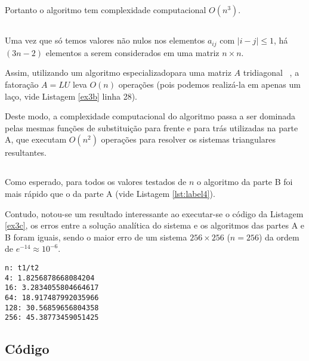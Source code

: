 \documentclass[12pt,a4paper,final]{article}
\begin{document}
Portanto o algoritmo tem complexidade computacional $ O(n^3) $.

\subsection{}
Uma vez que só temos valores não nulos nos elementos $ a_{ij} $ com $ |i − j| \leq 1 $,
há $ (3n - 2) $ elementos a serem considerados em uma matriz $ n \times n $.

Assim, utilizando um algoritmo especializadopara uma matriz $ A $
tridiagonal~\cite{barannyk} , a fatoração $ A=LU $ leva $ O(n) $ operações (pois 
podemos realizá-la em apenas um laço, vide Listagem \ref{ex3b} linha 28).

Deste modo, a complexidade computacional do algoritmo passa a ser dominada pelas mesmas 
funções de substituição para frente e para trás utilizadas na parte A, que 
executam $ O(n^2) $ operações para resolver os sistemas triangulares resultantes.

\subsection{}
Como esperado, para todos os valores testados de $ n $ o algoritmo da parte B foi mais rápido que o da parte A (vide Listagem \ref{lst:label4}).

Contudo, notou-se um resultado interessante ao executar-se o código da Listagem \ref{ex3c},
os erros entre a solução analítica do sistema e os algoritmos das partes A e B foram 
iguais, sendo o maior erro de um sistema $ 256 \times 256 $ ($ n = 256 $) da ordem de 
$ e^{-14} \approx 10^{-6} $.

\begin{lstlisting}[caption= \textbf{Razão entre o tempo de execução do algoritmo da 
parte A ($ t_1 $) pelo da parte B ($ t_2 $) para solução do sistema da parte C de tamanho 
$ n \times n $. Média para 10 repetições, conforme código da Listagem 
\ref{mediaex3c}.},label={lst:label4}]
n: t1/t2
4: 1.8256878668084204
16: 3.2834055804664617
64: 18.917487992035966
128: 30.56859656804358
256: 45.38773459051425
\end{lstlisting}

\subsection*{Código}










\footnotesize{

}
\end{document}
